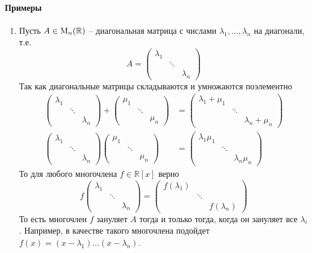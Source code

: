 \paragraph{Примеры}
\begin{enumerate}
\item Пусть $A\in\operatorname{M}_{n}(\mathbb R)$ -- диагональная матрица с числами $\lambda_1,\ldots, \lambda_n$ на диагонали, т.е.
\[
A = 
\begin{pmatrix}
{\lambda_1}&{}&{}\\
{}&{\ddots}&{}\\
{}&{}&{\lambda_n}
\end{pmatrix}
\]
Так как диагональные матрицы складываются и умножаются поэлементно
\begin{align*}
\begin{pmatrix}
{\lambda_1}&{}&{}\\
{}&{\ddots}&{}\\
{}&{}&{\lambda_n}
\end{pmatrix}
+
\begin{pmatrix}
{\mu_1}&{}&{}\\
{}&{\ddots}&{}\\
{}&{}&{\mu_n}
\end{pmatrix}
&=
\begin{pmatrix}
{\lambda_1 + \mu_1}&{}&{}\\
{}&{\ddots}&{}\\
{}&{}&{\lambda_n + \mu_n}
\end{pmatrix}\\
\begin{pmatrix}
{\lambda_1}&{}&{}\\
{}&{\ddots}&{}\\
{}&{}&{\lambda_n}
\end{pmatrix}
\begin{pmatrix}
{\mu_1}&{}&{}\\
{}&{\ddots}&{}\\
{}&{}&{\mu_n}
\end{pmatrix}
&=
\begin{pmatrix}
{\lambda_1 \mu_1}&{}&{}\\
{}&{\ddots}&{}\\
{}&{}&{\lambda_n \mu_n}
\end{pmatrix}
\end{align*}
То для любого многочлена $f\in\mathbb R[x]$ верно
\[
f
\begin{pmatrix}
{\lambda_1}&{}&{}\\
{}&{\ddots}&{}\\
{}&{}&{\lambda_n}
\end{pmatrix}
=
\begin{pmatrix}
{f(\lambda_1)}&{}&{}\\
{}&{\ddots}&{}\\
{}&{}&{f(\lambda_n)}
\end{pmatrix}
\]
То есть многочлен $f$ зануляет $A$ тогда и только тогда, когда он зануляет все $\lambda_i$. Например, в качестве такого многочлена подойдет $f(x) = (x-\lambda_1)\ldots(x-\lambda_n)$.



\end{enumerate}
